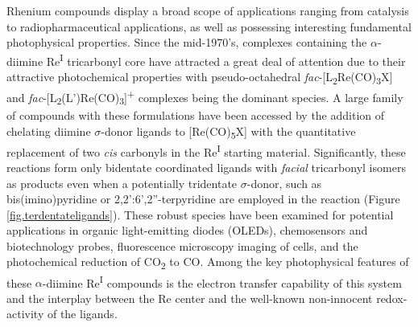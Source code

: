 Rhenium compounds display a broad scope of applications ranging from catalysis\autocite{dudle2011, jain2008, kuninobu2011} to radiopharmaceutical applications\autocite{bartholoma2009, schibli2002}, as well as possessing interesting fundamental photophysical properties\autocite{coogan2009}. Since the mid-1970's, complexes containing the $\alpha$-diimine Re\textsuperscript{I} tricarbonyl core have attracted a great deal of attention due to their attractive photochemical properties with pseudo-octahedral \textit{fac}-[L\textsubscript{2}Re(CO)\textsubscript{3}X] and \textit{fac}-[L\textsubscript{2}(L')Re(CO)\textsubscript{3}]\textsuperscript{+} complexes being the dominant species\autocite{giordano1979, fredericks1979, sacksteder1990, caspar1983, yam2001, feliz1998, ruiz1996, lin1992, hino1992, walters2002, striplin2001}. A large family of compounds with these formulations have been accessed by the addition of chelating diimine $\sigma$-donor ligands to [Re(CO)\textsubscript{5}X] with the quantitative replacement of two \textit{cis} carbonyls in the Re\textsuperscript{I} starting material\autocite{giordano1979, martin2011, abel1959, kirkham1965, zingales1967, gamelin1994, marti2005, morse1976, giordano1978}. Significantly, these reactions form only bidentate coordinated ligands with \textit{facial} tricarbonyl isomers as products even when a potentially tridentate $\sigma$-donor, such as bis(imino)pyridine or 2,2':6',2''-terpyridine are employed in the reaction (Figure \ref{fig.terdentateligands})\autocite{granifo1999, orrell1997, abel1993}. These robust species have been examined for potential applications in organic light-emitting diodes (OLEDs)\autocite{gong1998}, chemosensors and biotechnology probes\autocite{lo2010, lin2007, slone1995, beer1999, beer2003}, fluorescence microscopy imaging of cells\autocite{lo2010, amoroso2008, amoroso2007}, and the photochemical reduction of CO\textsubscript{2} to CO\autocite{hawecker1983, hawecker1986, takeda2010, christensen1992, sullivan1985}. Among the key photophysical features of these $\alpha$-diimine Re\textsuperscript{I} compounds is the electron transfer capability of this system and the interplay between the Re center and the well-known non-innocent redox-activity of the ligands\autocite{caulton2012}.

